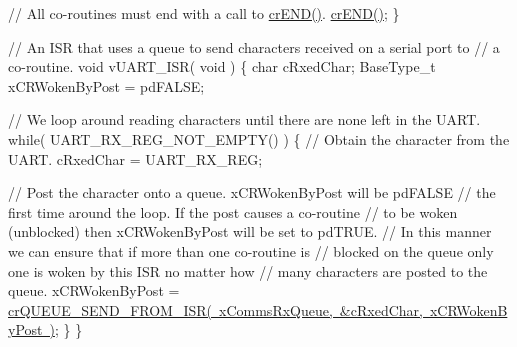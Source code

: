 \begin{DoxyPre}    // All co-routines must end with a call to \mbox{\hyperlink{croutine_8h_ae6038cc976689b50000475ebfc4e2f23}{crEND()}}.
    \mbox{\hyperlink{croutine_8h_ae6038cc976689b50000475ebfc4e2f23}{crEND()}};
\}\end{DoxyPre}



\begin{DoxyPre}// An ISR that uses a queue to send characters received on a serial port to
// a co-routine.
void vUART\_ISR( void )
\{
char cRxedChar;
BaseType\_t xCRWokenByPost = pdFALSE;\end{DoxyPre}



\begin{DoxyPre}    // We loop around reading characters until there are none left in the UART.
    while( UART\_RX\_REG\_NOT\_EMPTY() )
    \{
        // Obtain the character from the UART.
        cRxedChar = UART\_RX\_REG;\end{DoxyPre}



\begin{DoxyPre}        // Post the character onto a queue.  xCRWokenByPost will be pdFALSE
        // the first time around the loop.  If the post causes a co-routine
        // to be woken (unblocked) then xCRWokenByPost will be set to pdTRUE.
        // In this manner we can ensure that if more than one co-routine is
        // blocked on the queue only one is woken by this ISR no matter how
        // many characters are posted to the queue.
        xCRWokenByPost = \mbox{\hyperlink{croutine_8h_ac8eb0a81c5cf69de7e4edd73ce44a3be}{crQUEUE\_SEND\_FROM\_ISR( xCommsRxQueue, \&cRxedChar, xCRWokenByPost )}};
    \}
\}\end{DoxyPre}
 